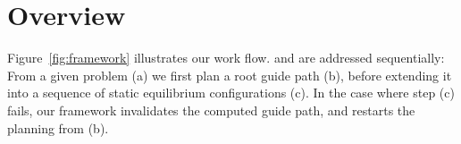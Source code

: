 \documentclass[journal]{IEEEtran}
\begin{document}

\section{Overview}
\label{overview}


Figure~\ref{fig:framework} illustrates our work flow.
\Pa and \Pb are addressed sequentially: From a given problem (a) we first plan a root guide path (b), before
extending it into a sequence of static equilibrium configurations (c). In the case where step (c) fails,
our framework invalidates the computed guide path, and restarts the planning from (b).
\end{document}
